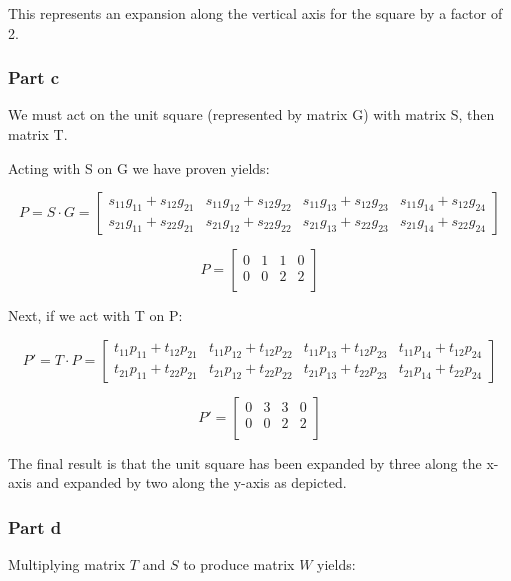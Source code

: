 \documentclass{article}
\begin{document}
This represents an expansion along the vertical axis for the square by a factor of 2.

\subsubsection*{Part c}

We must act on the unit square (represented by matrix G) with matrix S, then matrix T. 

Acting with S on G we have proven yields:

\[ 
P = S \cdot G = 
\begin{bmatrix}
    s_{11}g_{11} + s_{12}g_{21} & s_{11}g_{12} + s_{12}g_{22} & s_{11}g_{13} + s_{12}g_{23} & s_{11}g_{14} + s_{12}g_{24} \\
    s_{21}g_{11} + s_{22}g_{21} & s_{21}g_{12} + s_{22}g_{22} & s_{21}g_{13} + s_{22}g_{23} & s_{21}g_{14} + s_{22}g_{24}
\end{bmatrix}
\]

\[P = 
\begin{bmatrix}
    0 & 1 & 1 & 0 \\
    0 & 0 & 2 & 2 \\
\end{bmatrix}
\]

Next, if we act with T on P:

\[ 
P' = T \cdot P = 
\begin{bmatrix}
    t_{11}p_{11} + t_{12}p_{21} & t_{11}p_{12} + t_{12}p_{22} & t_{11}p_{13} + t_{12}p_{23} & t_{11}p_{14} + t_{12}p_{24} \\
    t_{21}p_{11} + t_{22}p_{21} & t_{21}p_{12} + t_{22}p_{22} & t_{21}p_{13} + t_{22}p_{23} & t_{21}p_{14} + t_{22}p_{24}
\end{bmatrix}
\]

\[P' = 
\begin{bmatrix}
    0 & 3 & 3 & 0 \\
    0 & 0 & 2 & 2 \\
\end{bmatrix}
\]

The final result is that the unit square has been expanded by three along the x-axis and expanded by two along the y-axis as depicted. 

\subsubsection*{Part d}

Multiplying matrix $T$ and $S$ to produce matrix $W$ yields:
\end{document}
